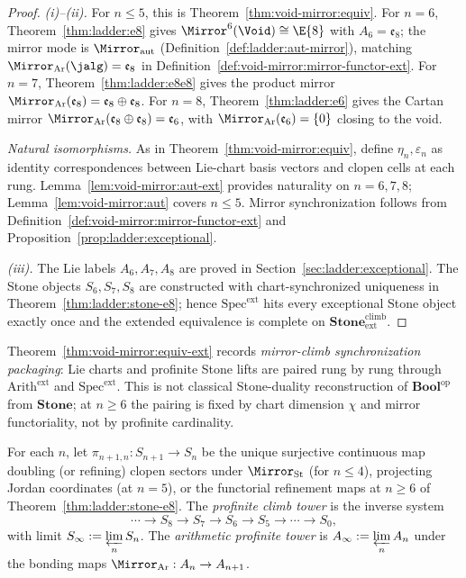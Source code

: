 \begin{proof}
\emph{(i)--(ii).} For $n\leq5$, this is Theorem~\ref{thm:void-mirror:equiv}.
For $n=6$, Theorem~\ref{thm:ladder:e8} gives
$\Mirror^6(\Void)\cong\E{8}$ with $A_6=\mathfrak{e}_8$; the mirror mode is
$\Mirror_{\mathrm{aut}}$ (Definition~\ref{def:ladder:aut-mirror}), matching
$\Mirror_{\mathrm{Ar}}(\jalg)=\mathfrak{e}_8$ in
Definition~\ref{def:void-mirror:mirror-functor-ext}. For $n=7$,
Theorem~\ref{thm:ladder:e8e8} gives the product mirror
$\Mirror_{\mathrm{Ar}}(\mathfrak{e}_8)=\mathfrak{e}_8\oplus\mathfrak{e}_8$.
For $n=8$, Theorem~\ref{thm:ladder:e6} gives the Cartan mirror
$\Mirror_{\mathrm{Ar}}(\mathfrak{e}_8\oplus\mathfrak{e}_8)=\mathfrak{e}_6$,
with $\Mirror_{\mathrm{Ar}}(\mathfrak{e}_6)=\{0\}$ closing to the void.

\emph{Natural isomorphisms.} As in Theorem~\ref{thm:void-mirror:equiv}, define
$\eta_n,\varepsilon_n$ as identity correspondences between Lie-chart basis
vectors and clopen cells at each rung. Lemma~\ref{lem:void-mirror:aut-ext}
provides naturality on $n=6,7,8$; Lemma~\ref{lem:void-mirror:aut} covers
$n\leq5$. Mirror synchronization follows from
Definition~\ref{def:void-mirror:mirror-functor-ext} and
Proposition~\ref{prop:ladder:exceptional}.

\emph{(iii).} The Lie labels $A_6,A_7,A_8$ are proved in
Section~\ref{sec:ladder:exceptional}. The Stone objects $S_6,S_7,S_8$ are
constructed with chart-synchronized uniqueness in
Theorem~\ref{thm:ladder:stone-e8}; hence
$\mathrm{Spec}^{\mathrm{ext}}$ hits every exceptional Stone object exactly once
and the extended equivalence is complete on
$\mathbf{Stone}^{\mathrm{climb}}_{\mathrm{ext}}$.
\end{proof}

\begin{remark}\label{rem:void-mirror:sync-pack}
Theorem~\ref{thm:void-mirror:equiv-ext} records \emph{mirror-climb
synchronization packaging}: Lie charts and profinite Stone lifts are paired
rung by rung through $\mathrm{Arith}^{\mathrm{ext}}$ and
$\mathrm{Spec}^{\mathrm{ext}}$. This is not classical Stone-duality
reconstruction of $\mathbf{Bool}^{\mathrm{op}}$ from $\mathbf{Stone}$; at
$n\geq6$ the pairing is fixed by chart dimension $\chi$ and mirror
functoriality, not by profinite cardinality.
\end{remark}

\begin{definition}\label{def:void-mirror:profinite}
For each $n$, let $\pi_{n+1,n}:S_{n+1}\to S_n$ be the unique surjective
continuous map doubling (or refining) clopen sectors under $\Mirror_{\mathrm{St}}$
(for $n\leq4$), projecting Jordan coordinates (at $n=5$), or the
functorial refinement maps at $n\geq6$ of
Theorem~\ref{thm:ladder:stone-e8}. The \emph{profinite climb
tower} is the inverse system
\[
  \cdots\longrightarrow S_8\longrightarrow S_7\longrightarrow S_6
  \longrightarrow S_5\longrightarrow\cdots\longrightarrow S_0,
\]
with limit $\displaystyle S_\infty:=\varprojlim_n S_n$.
The \emph{arithmetic profinite tower} is
$\displaystyle A_\infty:=\varprojlim_n A_n$ under the bonding maps
$\Mirror_{\mathrm{Ar}}:A_n\to A_{n+1}$.
\end{definition}

